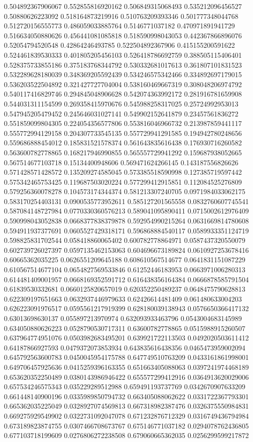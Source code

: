 \begin{table}
\begin{tabu}
\begin{sparkline}{10}
0.504892367906067 0.552855816920162 0.506849315068493 0.535212096456527 0.50880626223092 0.518164873219916 0.510763209393346 0.501777348044768 0.512720156555773 0.486059033885764 0.5146771037182 0.470971891941729 0.516634050880626 0.456441081085818 0.518590998043053 0.442367866896076 0.52054794520548 0.42864246493785 0.522504892367906 0.415155200591622 0.524461839530333 0.401805205456103 0.526418786692759 0.388505115406401 0.528375733855186 0.375183768344792 0.530332681017613 0.361807101831523 0.532289628180039 0.348369205592439 0.534246575342466 0.334892697179015 0.536203522504892 0.321427727704004 0.538160469667319 0.308048206974792 0.540117416829746 0.294845048906628 0.542074363992172 0.281916781659908 0.544031311154599 0.269358415970676 0.545988258317025 0.25724992953013 0.547945205479452 0.245646031027141 0.549902152641879 0.23457561836272 0.551859099804305 0.224054356577806 0.553816046966732 0.213987859441117 0.555772994129158 0.204307733545135 0.557729941291585 0.194942780248656 0.559686888454012 0.185831521578374 0.561643835616438 0.176930716260582 0.563600782778865 0.168217946990855 0.565557729941292 0.159687938052665 0.567514677103718 0.15134400948606 0.569471624266145 0.143187556826626 0.571428571428572 0.135209274585045 0.573385518590998 0.127385719597442 0.575342465753425 0.119687503020224 0.577299412915851 0.112084525276809 0.579256360078278 0.104573174344374 0.581213307240705 0.0971984033062175 0.583170254403131 0.0900535773952611 0.585127201565558 0.0832760607745541 0.587084148727984 0.0770330360576213 0.589041095890411 0.0715002612976409 0.590998043052838 0.0668377838379878 0.592954990215264 0.0631669814780608 0.594911937377691 0.0605527429318171 0.596868884540117 0.0589933351124719 0.598825831702544 0.058418860065402 0.600782778864971 0.0587437320550079 0.602739726027397 0.0597135462153063 0.604696673189824 0.0610927253678416 0.60665362035225 0.0626551209645188 0.608610567514677 0.0641831151087229 0.610567514677104 0.0654827569533846 0.61252446183953 0.0663971006280313 0.614481409001957 0.0668169352591712 0.616438356164384 0.0666878585791504 0.61839530332681 0.0660125820657019 0.620352250489237 0.0648475790628813 0.622309197651663 0.0632937446979633 0.62426614481409 0.061480633004203 0.626223091976517 0.0595561217919399 0.628180039138943 0.0576650366417132 0.63013698630137 0.055897213970974 0.632093933463796 0.0543004683145989 0.634050880626223 0.0528790530717311 0.63600782778865 0.0515988915260507 0.637964774951076 0.0503982683495201 0.639921722113503 0.0492020503611412 0.64187866927593 0.0479372073853934 0.643835616438356 0.0465473959002094 0.645792563600783 0.0450045954175788 0.647749510763209 0.0433161861998001 0.649706457925636 0.0415259396163355 0.651663405088063 0.0397241974468189 0.653620352250489 0.0380143986946422 0.655577299412916 0.0364913620029006 0.657534246575343 0.035229289512988 0.659491193737769 0.0342670907633209 0.661448140900196 0.0335989850794732 0.663405088062622 0.0331722367793301 0.665362035225049 0.0328927074569813 0.667318982387476 0.0326375550984831 0.669275929549902 0.0322731092047078 0.671232876712329 0.0316749436794984 0.673189823874755 0.0307466708673767 0.675146771037182 0.0294078762436805 0.677103718199609 0.0276806272238508 0.679060665362035 0.0256299599217872 
\end{sparkline}
\end{tabu}
\end{table}
